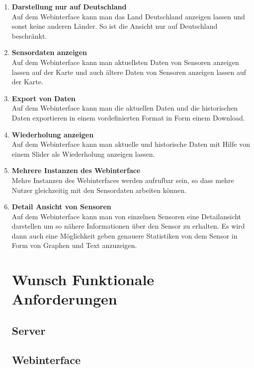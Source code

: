 \begin{enumerate}[label=\textbf{PF\arabic{enumi}0}]
	 \item \textbf{Darstellung nur auf Deutschland}\\
	 	Auf dem Webinterface kann man das Land Deutschland anzeigen lassen und sonst keine anderen Länder. So ist die Ansicht nur auf Deutschland beschränkt.
	 
	 \item \textbf{Sensordaten anzeigen}\\
		Auf dem Webinterface kann man aktuellsten Daten von Sensoren anzeigen lassen auf der Karte und auch ältere Daten von Sensoren anzeigen lassen auf der Karte.
		
	\item \textbf{Export von Daten}\\
		Auf dem Webinterface kann man die aktuellen Daten und die historischen Daten exportieren in einem vordefinierten Format in Form einem Download. 
		
	\item \textbf{Wiederholung anzeigen}\\
		Auf dem Webinterface kann man aktuelle und historische Daten mit Hilfe von einem Slider als Wiederholung anzeigen lassen.
		
	\item \textbf{Mehrere Instanzen des Webinterface}\\
		Mehre Instanzen des Webinterfaces werden aufrufbar sein, so dass mehre Nutzer gleichzeitig mit den Sensordaten arbeiten können.
		
	\item \textbf{Detail Ansicht von Sensoren}\\
		Auf dem Webinterface kann man von einzelnen Sensoren eine Detailansicht darstellen um so nähere Informationen über den Sensor zu erhalten. Es wird dann auch eine Möglichkeit geben genauere Statistiken von dem Sensor in Form von Graphen und Text anzuzeigen.
	
	
	\section{Wunsch Funktionale Anforderungen}
	\subsection{Server}
	\subsection{Webinterface}
	
	 
	  
\end{enumerate}
